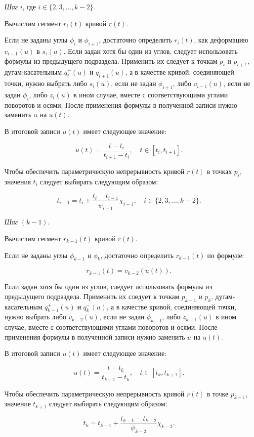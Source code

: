 \bigskip
\textit{Шаг} $i$, где $i \in \{2,3,\dots,k-2\}$.

Вычислим сегмент $r_i(t)$ кривой $r(t)$.

Если не заданы углы $\phi_i$ и $\phi_{i+1}$, достаточно определить $r_i(t)$, как деформацию $v_{i-1}(u)$ в $s_i(u)$.
Если задан хотя бы один из углов, следует использовать формулы из предыдущего подраздела. Применить их следует к
точкам $p_i$ и $p_{i+1}$, дугам-касательным $q_i^+(u)$ и $q_{i+1}^-(u)$, а в качестве кривой, соединяющей точки,
нужно выбрать либо $s_i(u)$, если не задан $\phi_{i+1}$, либо $v_{i-1}(u)$, если не задан $\phi_i$, либо $z_i(u)$
в ином случае, вместе с соответствующими углами поворотов и осями. После применения формулы в полученной записи нужно
заменить $u$ на $u(t)$.

В итоговой записи $u(t)$ имеет следующее значение:

$$
u(t)=\frac{t-t_i}{t_{i+1}-t_i}, \quad t \in [t_i,t_{i+1}].
$$

Чтобы обеспечить параметрическую непрерывность кривой $r(t)$ в точках $p_i$, значения $t_i$ следует выбирать
следующим образом:

$$
t_{i+1}=t_i+\frac{t_i-t_{i-1}}{\psi_{i-1}}\chi_{i-1}, \quad i \in \{2,3,\dots,k-2\}.
$$

\bigskip
\textit{Шаг} $(k-1)$.

Вычислим сегмент $r_{k-1}(t)$ кривой $r(t)$.

Если не заданы углы $\phi_{k-1}$ и $\phi_k$, достаточно определить $r_{k-1}(t)$ по формуле:

$$
r_{k-1}(t)=v_{k-2}(u(t)).
$$

Если задан хотя бы один из углов, следует использовать формулы из предыдущего подраздела. Применить их следует к
точкам $p_{k-1}$ и $p_k$, дугам-касательным $q_{k-1}^+(u)$ и $q_k^-(u)$, а в качестве кривой, соединяющей точки,
нужно выбрать либо $v_{k-2}(u)$, если не задан $\phi_{k-1}$, либо $z_{k-1}(u)$ в ином случае, вместе с соответствующими
углами поворотов и осями. После применения формулы в полученной записи нужно заменить $u$ на $u(t)$.

В итоговой записи $u(t)$ имеет следующее значение:

$$
u(t)=\frac{t-t_k}{t_{k+1}-t_k}, \quad t \in [t_k,t_{k+1}].
$$

Чтобы обеспечить параметрическую непрерывность кривой $r(t)$ в точке $p_{k-1}$, значение $t_{k+1}$ следует выбирать
следующим образом:

$$
t_k=t_{k-1}+\frac{t_{k-1}-t_{k-2}}{\psi_{k-2}}\chi_{k-2}.
$$

